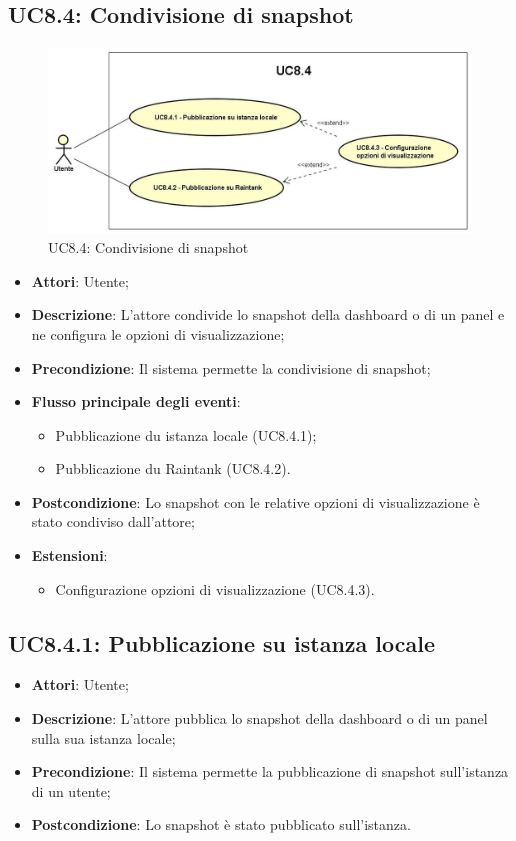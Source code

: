 \subsection{UC8.4: Condivisione di snapshot}
\begin{figure} [H]
	\centering
	\includegraphics[scale=0.45]{Img/UC8-4}
	\caption{UC8.4: Condivisione di snapshot}\label{}
\end{figure}
\begin{itemize}
	\item \textbf{Attori}: Utente;
	\item \textbf{Descrizione}: L'attore condivide lo snapshot della dashboard o di un panel e ne configura le opzioni di visualizzazione;
	\item \textbf{Precondizione}: Il sistema permette la condivisione di snapshot;
	\item \textbf{Flusso principale degli eventi}:
	\begin{itemize}
		\item Pubblicazione du istanza locale (UC8.4.1);
		\item Pubblicazione du Raintank (UC8.4.2).
	\end{itemize}
	\item \textbf{Postcondizione}: Lo snapshot con le relative opzioni di visualizzazione è stato condiviso dall'attore;
	\item \textbf{Estensioni}:
	\begin{itemize}
		\item Configurazione opzioni di visualizzazione (UC8.4.3).
	\end{itemize}
\end{itemize}

\subsection{UC8.4.1: Pubblicazione su istanza locale}
\begin{itemize}
	\item \textbf{Attori}: Utente;
	\item \textbf{Descrizione}: L'attore pubblica lo snapshot della dashboard o di un panel sulla sua istanza locale;
	\item \textbf{Precondizione}: Il sistema permette la pubblicazione di snapshot sull'istanza di un utente;
	\item \textbf{Postcondizione}: Lo snapshot è stato pubblicato sull'istanza.
\end{itemize}

